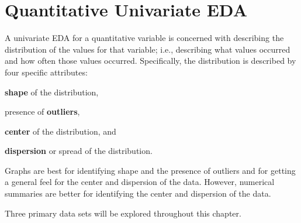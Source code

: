 \documentclass[10pt,openany]{book}\usepackage[]{graphicx}\usepackage[]{color}
\begin{document}
\vspace{-6pt}
\section{Quantitative Univariate EDA}
\vspace{-12pt}
A univariate EDA for a quantitative variable is concerned with describing the distribution of the values for that variable; i.e., describing what values occurred and how often those values occurred.  Specifically, the distribution is described by four specific attributes:

\vspace{-12pt}
\begin{Enumerate}
  \item \textbf{shape} of the distribution,
  \item presence of \textbf{outliers},
  \item \textbf{center} of the distribution, and
  \item \textbf{dispersion} or spread of the distribution.
\end{Enumerate}
\vspace{-8pt}

Graphs are best for identifying shape and the presence of outliers and for getting a general feel for the center and dispersion of the data.  However, numerical summaries are better for identifying the center and dispersion of the data.

\vspace{-6pt}

\vspace{-12pt}

Three primary data sets will be explored throughout this chapter.
\end{document}
